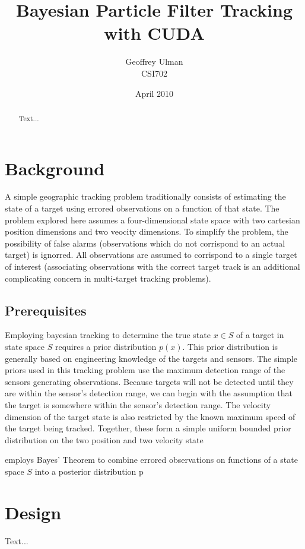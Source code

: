 \documentclass{article}
\begin{document}
\title{Bayesian Particle Filter Tracking with CUDA}
\author{Geoffrey Ulman\\
        CSI702}
\date{April 2010}
\maketitle

\begin{abstract}
Text...
\end{abstract}

\tableofcontents

\section{Background}
A simple geographic tracking problem traditionally consists of estimating the state of a target using errored observations on a function of that state. The problem explored here assumes a four-dimensional state space with two cartesian position dimensions and two veocity dimensions. To simplify the problem, the possibility of false alarms (observations which do not corrispond to an actual target) is ignorred. All observations are assumed to corrispond to a single target of interest (associating observations with the correct target track is an additional complicating concern in multi-target tracking problems).

\subsection{Prerequisites}
Employing bayesian tracking to determine the true state \(x \in S\) of a target in state space \(S\) requires a prior distribution \(p(x)\). This prior distribution is generally based on engineering knowledge of the targets and sensors. The simple priors used in this tracking problem use the maximum detection range of the sensors generating observations. Because targets will not be detected until they are within the sensor's detection range, we can begin with the assumption that the target is somewhere within the sensor's detection range. The velocity dimension of the target state is also restricted by the known maximum speed of the target being tracked. Together, these form a simple uniform bounded prior distribution on the two position and two velocity state 

 employs Bayes' Theorem to combine errored observations on functions of a state space \(S\) into a posterior distribution p

\section{Design}
Text...
\end{document}
